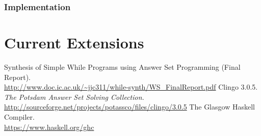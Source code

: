 \documentclass[a4paper,twoside,notitlepage,12pt]{article}
\begin{document}
\subsubsection{Implementation} \label{sec:gnx:imp}

\clearpage
\section{Current Extensions} \label{sec:cur}

\clearpage
\begin{thebibliography}{9}
        Synthesis of Simple While Programs using Answer Set Programming (Final Report). 
        \\ \url{http://www.doc.ic.ac.uk/~jjc311/while-synth/WS_FinalReport.pdf}
        Clingo 3.0.5. \emph{The Potsdam Answer Set Solving Collection.}
        \\ \url{http://sourceforge.net/projects/potassco/files/clingo/3.0.5}
        The Glasgow Haskell Compiler.
        \\ \url{https://www.haskell.org/ghc}
\end{thebibliography}
\end{document}
